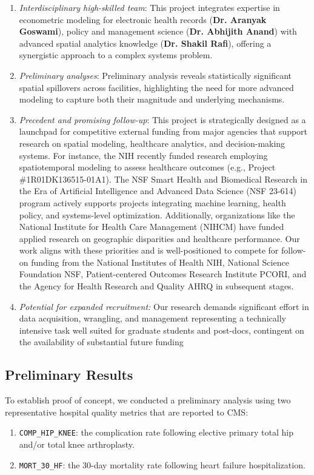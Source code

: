 \documentclass[10pt]{article}
\begin{document}
\begin{enumerate}[itemsep=0pt, parsep=0pt]
	\item \textit{Interdisciplinary high-skilled team}: This project integrates expertise in econometric modeling for electronic health records (\textbf{Dr. Aranyak Goswami}), policy and management science (\textbf{Dr. Abhijith Anand}) with advanced spatial analytics knowledge (\textbf{Dr. Shakil Rafi}), offering a synergistic approach to a complex systems problem.
	\item \textit{Preliminary analyses}: Preliminary analysis reveals statistically significant spatial spillovers across facilities, highlighting the need for more advanced modeling to capture both their magnitude and underlying mechanisms.
	\item \textit{Precedent and promising follow-up}: This project is strategically designed as a launchpad for competitive external funding from major agencies that support research on spatial modeling, healthcare analytics, and decision-making systems. For instance, the NIH recently funded research employing spatiotemporal modeling to assess healthcare outcomes (e.g., Project \#1R01DK136515-01A1). The NSF Smart Health and Biomedical Research in the Era of Artificial Intelligence and Advanced Data Science (NSF 23-614) program actively supports projects integrating machine learning, health policy, and systems-level optimization. Additionally, organizations like the National Institute for Health Care Management (NIHCM) have funded applied research on geographic disparities and healthcare performance. Our work aligns with these priorities and is well-positioned to compete for follow-on funding from the National Institutes of Health NIH, National Science Foundation NSF, Patient-centered Outcomes Research Institute PCORI, and the Agency for Health Research and Quality AHRQ in subsequent stages.
	\item \textit{Potential for expanded recruitment:} Our research demands significant effort in data acquisition, wrangling, and management representing a technically intensive task well suited for graduate students and post-docs, contingent on the availability of substantial future funding
\end{enumerate}
\subsection*{Preliminary Results}

To establish proof of concept, we conducted a preliminary analysis using two representative hospital quality metrics that are reported to CMS:
\begin{enumerate}[itemsep=0pt, parsep=0pt]
	\item \texttt{COMP\_HIP\_KNEE}: the complication rate following elective primary total hip and/or total knee arthroplasty.
	\item \texttt{MORT\_30\_HF}: the 30-day mortality rate following heart failure hospitalization.
\end{enumerate}
\end{document}
